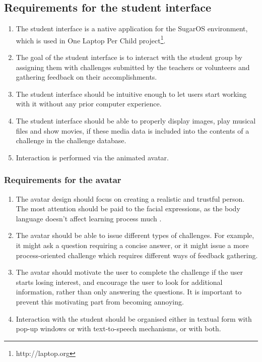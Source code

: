 \documentclass[a4paper]{article}
\begin{document}
\subsection{Requirements for the student interface}

\begin{enumerate}
\item The student interface is a native application for the SugarOS environment, which is used in One Laptop Per Child project\footnote{http://laptop.org}. 

\item The goal of the student interface is to interact with the student group by assigning them with challenges submitted by the teachers or volunteers and gathering feedback on their accomplishments. 

\item The student interface should be intuitive enough to let users start working with it without any prior computer experience.

\item The student interface should be able to properly display images, play musical files and show movies, if these media data is included into the contents of a challenge in the challenge database.

\item Interaction is performed via the animated avatar.
\end{enumerate}

\subsubsection{Requirements for the avatar}

\begin{enumerate}
\item The avatar design should focus on creating a realistic and trustful person. The most attention should be paid to the facial expressions, as the body language doesn't affect learning process much \cite{Cowell}.

\item The avatar should be able to issue different types of challenges. For example, it might ask a question requiring a concise answer, or it might issue a more process-oriented challenge which requires different ways of feedback gathering.

\item The avatar should motivate the user to complete the challenge if the user starts losing interest, and encourage the user to look for additional information, rather than only answering the questions. It is important to prevent this motivating part from becoming annoying.

\item Interaction with the student should be organised either in textual form with pop-up windows or with text-to-speech mechanisms, or with both.
\end{enumerate}
\end{document}
